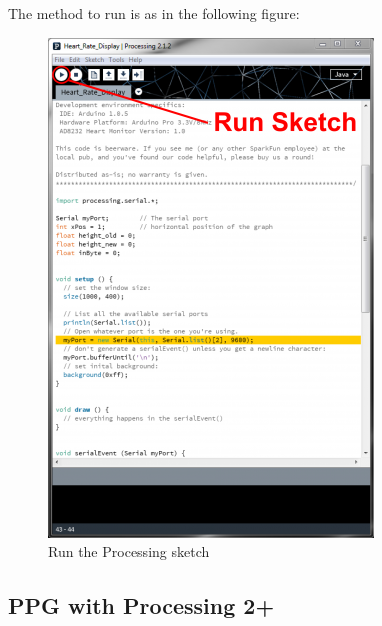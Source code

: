 The method to run is as in the following figure: 

\begin{figure}[H]
	\centering
	\includegraphics[width=0.4\linewidth]{ecgprocessing.png}
	\caption{Run the Processing sketch \cite{ad8232}}
\end{figure}

\subsection{PPG with Processing 2+}

